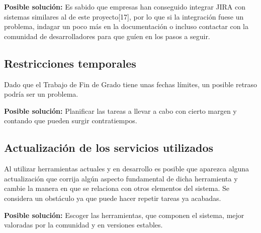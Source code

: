 \textbf{Posible solución:} Es sabido que empresas han conseguido integrar JIRA con sistemas similares al de este proyecto[17], por lo que si la integración fuese un problema, indagar un poco más en la documentación o incluso contactar con la comunidad de desarrolladores para que guíen en los pasos a seguir.

\subsection{Restricciones temporales}
Dado que el Trabajo de Fin de Grado tiene unas fechas límites, un posible retraso podría ser un problema.

\textbf{Posible solución:} Planificar las tareas a llevar a cabo con cierto margen y contando que pueden surgir contratiempos.

\subsection{Actualización de los servicios utilizados}
Al utilizar herramientas actuales y en desarrollo es posible que aparezca alguna actualización que corrija algún aspecto fundamental de dicha herramienta y cambie la manera en que se relaciona con otros elementos del sistema. Se considera un obstáculo ya que puede hacer repetir tareas ya acabadas.

\textbf{Posible solución:} Escoger las herramientas, que componen el sistema, mejor valoradas por la comunidad y en versiones estables.




